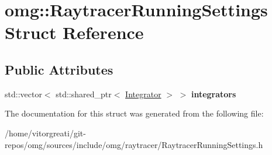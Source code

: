 \hypertarget{structomg_1_1_raytracer_running_settings}{}\section{omg\+::Raytracer\+Running\+Settings Struct Reference}
\label{structomg_1_1_raytracer_running_settings}
\subsection*{Public Attributes}
\begin{DoxyCompactItemize}
\item 
\mbox{\label{structomg_1_1_raytracer_running_settings_a1cd071285c237d06997852641a04d04e}} 
std\+::vector$<$ std\+::shared\+\_\+ptr$<$ \mbox{\hyperlink{classomg_1_1_integrator}{Integrator}} $>$ $>$ {\bfseries integrators}
\end{DoxyCompactItemize}


The documentation for this struct was generated from the following file\+:\begin{DoxyCompactItemize}
\item 
/home/vitorgreati/git-\/repos/omg/sources/include/omg/raytracer/Raytracer\+Running\+Settings.\+h\end{DoxyCompactItemize}
